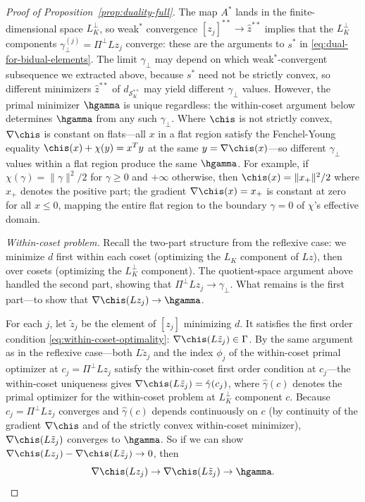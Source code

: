 \documentclass{article}
\newcommand{\calS}{\mathcal{S}}
\begin{document}
\begin{proof}[Proof of
Proposition~\ref{prop:duality-full}]
The map $A^*$ lands in the finite-dimensional space $L_K^\perp$, so weak$^*$ convergence $[z_j]^{**} \to \hat z^{**}$ implies that the $L_K^\perp$ components $\gamma_\perp^{(j)} = \Pi^\perp L z_j$ converge: these are the arguments to $s^*$ in \eqref{eq:dual-for-bidual-elements}. The limit $\gamma_\perp$ may depend on which weak$^*$-convergent subsequence we extracted above, because $s^*$ need not be strictly convex, so different minimizers $\hat z^{**}$ of $d_{\calS_K^{**}}$ may yield different $\gamma_\perp$ values. However, the primal minimizer $\hgamma$ is unique regardless: the within-coset argument below determines $\hgamma$ from any such $\gamma_\perp$. Where $\chis$ is not strictly convex, $\nabla \chis$ is constant on flats---all $x$ in a flat region satisfy the Fenchel-Young equality $\chis(x) + \chi(y) = x^T y$ at the same $y = \nabla\chis(x)$---so different $\gamma_\perp$ values within a flat region produce the same $\hgamma$. For example, if $\chi(\gamma) = \|\gamma\|^2/2$ for $\gamma \ge 0$ and $+\infty$ otherwise, then $\chis(x) = \|x_+\|^2/2$ where $x_+$ denotes the positive part; the gradient $\nabla\chis(x) = x_+$ is constant at zero for all $x \le 0$, mapping the entire flat region to the boundary $\gamma = 0$ of $\chi$'s effective domain.

\textit{Within-coset problem.} Recall the two-part structure from the reflexive case: we minimize $d$ first within each coset (optimizing the $L_K$ component of $Lz$), then over cosets (optimizing the $L_K^\perp$ component). The quotient-space argument above handled the second part, showing that $\Pi^\perp L z_j \to \gamma_\perp$. What remains is the first part---to show that $\nabla\chis(L z_j) \to \hgamma$.

For each $j$, let $\tilde z_j$ be the element of $[z_j]$ minimizing $d$. It satisfies the first order condition \eqref{eq:within-coset-optimality}: $\nabla\chis(L\tilde z_j) \in \Gamma$. By the same argument as in the reflexive case---both $L\tilde z_j$ and the index $\phi_j$ of the within-coset primal optimizer at $c_j = \Pi^\perp Lz_j$ satisfy the within-coset first order condition at $c_j$---the within-coset uniqueness gives $\nabla\chis(L\tilde z_j) = \hat\gamma(c_j)$, where $\hat\gamma(c)$ denotes the primal optimizer for the within-coset problem at $L_K^\perp$ component $c$. Because $c_j = \Pi^\perp Lz_j$ converges and $\hat\gamma(c)$ depends continuously on $c$ (by continuity of the gradient $\nabla\chis$ and of the strictly convex within-coset minimizer), $\nabla\chis(L\tilde z_j)$ converges to $\hgamma$. So if we can show $\nabla\chis(Lz_j) - \nabla\chis(L\tilde z_j) \to 0$, then
\begin{equation}\label{eq:gradient-chain}
\nabla\chis(Lz_j) \to \nabla\chis(L\tilde z_j) \to \hgamma.
\end{equation}



\end{proof}
\end{document}
